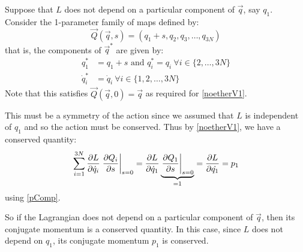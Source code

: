 \documentclass[../main.tex]{subfiles}
\begin{document}
\begin{example}
  Suppose that $L$ does not depend on a particular component of $\vec{q}$, say $q_1$.
  Consider the 1-parameter family of maps defined by:
  \[
    \vec{Q}(\vec{q}, s) = (q_1 + s, q_2, q_3, \ldots, q_{3N})
  \]
  that is, the components of $\vec{q}^{*}$ are given by:
  \begin{align*}
    q^{*}_1 &= q_1 + s \text{ and } q^{*}_i = q_i\ \forall i \in \{2, \ldots, 3N\} \\
    \dot{q}^{*}_i &= \dot{q}_i\ \forall i \in \{1, 2, \ldots, 3N\}
  \end{align*}
  Note that this satisfies $\vec{Q}(\vec{q}, 0) = \vec{q}$ as required for \cref{noetherV1}.

  This must be a symmetry of the action since we assumed that $L$ is independent of $q_1$ and so the action must be conserved.
  Thus by \cref{noetherV1}, we have a conserved quantity:
  \[
    \sum_{i = 1}^{3N} \pderiv{L}{\dot{q}_i} \at{\pderiv{Q_i}{s}}{s = 0} = \pderiv{L}{\dot{q}_1} \underbrace{\at{\pderiv{Q_1}{s}}{s = 0}}_{=1} = \pderiv{L}{\dot{q_1}} = p_1
  \]
  using \cref{pComp}.

  So if the Lagrangian does not depend on a particular component of $\vec{q}$, then its conjugate momentum is a conserved quantity.
  In this case, since $L$ does not depend on $q_1$, its conjugate momentum $p_1$ is conserved.
\end{example}
\end{document}
